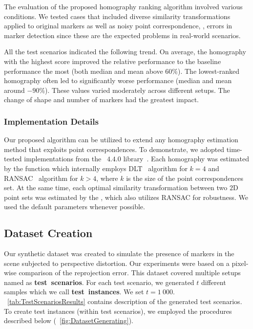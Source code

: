 The evaluation of the proposed homography ranking algorithm involved various conditions. We tested cases that included diverse similarity transformations applied to original markers as well as noisy point correspondence, \egtext{}, errors in marker detection since these are the expected problems in real-world scenarios.

All the test scenarios indicated the following trend. On average, the homography with the highest score improved the relative performance to the baseline performance the most (both median and mean above $60$\%). The lowest-ranked homography often led to significantly worse performance (median and mean around $-90$\%). These values varied moderately across different setups. The change of shape and number of markers had the greatest impact.

\subsubsection{Implementation Details}
\label{sssec:HomographyImplementation}

Our proposed algorithm can be utilized to extend any homography estimation method that exploits point correspondences. To demonstrate, we adopted time-tested implementations from the \opencv{}~$4.4.0$ library~\cite{bradski2008learning}. Each homography was estimated by the  function which internally employs DLT~\cite{abdel2015direct} algorithm for $k = 4$ and RANSAC~\cite{fischler1981ransac} algorithm for $k > 4$, where $k$ is the size of the point correspondences set. At the same time, each optimal similarity transformation between two $2$D point sets was estimated by the , which also utilizes RANSAC for robustness. We used the default parameters whenever possible.

\subsection{Dataset Creation}
\label{ssec:HomographyDatasetCreation}

Our synthetic dataset was created to simulate the presence of markers in the scene subjected to perspective distortion. Our experiments were based on a pixel-wise comparison of the reprojection error. This dataset covered multiple setups named as \mbox{\textbf{test scenarios}}. For each test scenario, we generated $t$ different samples which we call \mbox{\textbf{test instances}}. We set $t = 1\ 000$. \tabletext{}~\ref{tab:TestScenariosResults} contains description of the generated test scenarios. To create test instances (within test scenarios), we employed the procedures described below (\figtext{}~\ref{fig:DatasetGenerating}).

